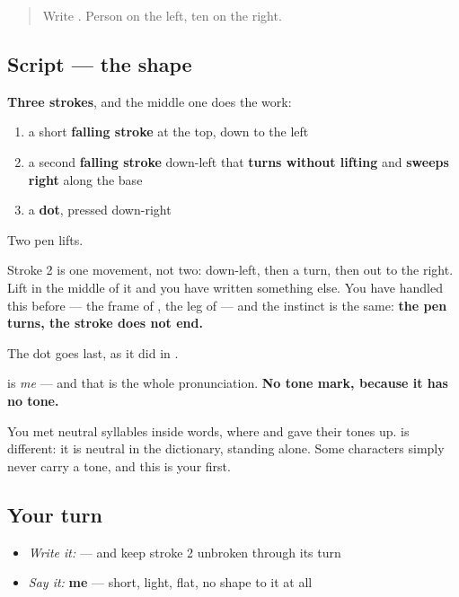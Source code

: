 \label{lesson:ZH-W09-me}



\begin{quote}
Write . Person on the left, ten on the right.
\end{quote}

\subsection*{Script — the shape}

\begin{quote}
\end{quote}

\textbf{Three strokes}, and the middle one does the work:

\begin{enumerate}
\raggedright
  \item a short \textbf{falling stroke} at the top, down to the left
  \item a second \textbf{falling stroke} down-left that \textbf{turns without lifting} and \textbf{sweeps right} along the base
  \item a \textbf{dot}, pressed down-right
\end{enumerate}

Two pen lifts.

Stroke 2 is one movement, not two: down-left, then a turn, then out to the right. Lift in the middle of it and you have written something else. You have handled this before — the frame of , the leg of  — and the instinct is the same: \textbf{the pen turns, the stroke does not end.}

The dot goes last, as it did in .

\begin{sounds}
\textbf{} is \emph{me} — and that is the whole pronunciation. \textbf{No tone mark, because it has no tone.}

You met neutral syllables inside words, where  and  gave their tones up.  is different: it is neutral in the dictionary, standing alone. Some characters simply never carry a tone, and this is your first.
\end{sounds}

\subsection*{Your turn}
\begin{itemize}
\raggedright
  \item \emph{Write it:}  — and keep stroke 2 unbroken through its turn
  \item \emph{Say it:} \textbf{me} — short, light, flat, no shape to it at all
\end{itemize}

